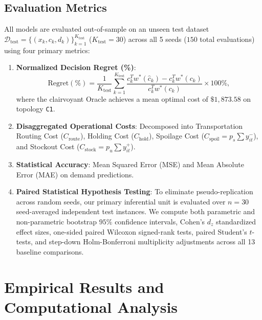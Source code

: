 \documentclass[11pt,a4paper]{article}
\theoremstyle{definition}
\theoremstyle{remark}
\begin{document}
\subsection{Evaluation Metrics}
\label{subsec:metrics}
All models are evaluated out-of-sample on an unseen test dataset $\mathcal{D}_{\text{test}} = \{(x_k, c_k, d_k)\}_{k=1}^{K_{\text{test}}}$ ($K_{\text{test}} = 30$) across all 5 seeds ($150$ total evaluations) using four primary metrics:
\begin{enumerate}[leftmargin=*]
    \item \textbf{Normalized Decision Regret (\%)}:
    \begin{equation*}
        \text{Regret}(\%) = \frac{1}{K_{\text{test}}} \sum_{k=1}^{K_{\text{test}}} \frac{c_k^T w^*(\hat{c}_k) - c_k^T w^*(c_k)}{c_k^T w^*(c_k)} \times 100\%,
    \end{equation*}
    where the clairvoyant Oracle achieves a mean optimal cost of $\$1,873.58$ on topology \texttt{C1}.
    \item \textbf{Disaggregated Operational Costs}: Decomposed into Transportation Routing Cost ($C_{\text{route}}$), Holding Cost ($C_{\text{hold}}$), Spoilage Cost ($C_{\text{spoil}} = p_s \sum y_{it}^-$), and Stockout Cost ($C_{\text{stock}} = p_u \sum y_{it}^+$).
    \item \textbf{Statistical Accuracy}: Mean Squared Error (MSE) and Mean Absolute Error (MAE) on demand predictions.
    \item \textbf{Paired Statistical Hypothesis Testing}: To eliminate pseudo-replication across random seeds, our primary inferential unit is evaluated over $n = 30$ seed-averaged independent test instances. We compute both parametric and non-parametric bootstrap $95\%$ confidence intervals, Cohen's $d_z$ standardized effect sizes, one-sided paired Wilcoxon signed-rank tests, paired Student's $t$-tests, and step-down Holm-Bonferroni multiplicity adjustments \citep{holm1979simple} across all 13 baseline comparisons.
\end{enumerate}

\section{Empirical Results and Computational Analysis}
\label{sec:results}
\end{document}
